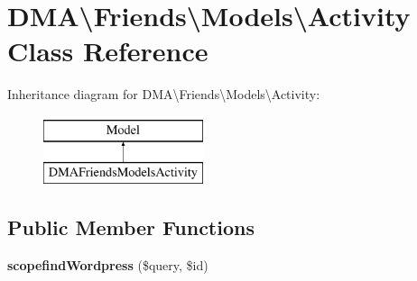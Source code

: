 \hypertarget{classDMA_1_1Friends_1_1Models_1_1Activity}{\section{D\-M\-A\textbackslash{}Friends\textbackslash{}Models\textbackslash{}Activity Class Reference}
\label{classDMA_1_1Friends_1_1Models_1_1Activity}
}
Inheritance diagram for D\-M\-A\textbackslash{}Friends\textbackslash{}Models\textbackslash{}Activity\-:\begin{figure}[H]
\begin{center}
\leavevmode
\includegraphics[height=2.000000cm]{dc/d8c/classDMA_1_1Friends_1_1Models_1_1Activity}
\end{center}
\end{figure}
\subsection*{Public Member Functions}
\begin{DoxyCompactItemize}
\item 
\hypertarget{classDMA_1_1Friends_1_1Models_1_1Activity_a5a533a3f638f99d1dd0a8e0550def49e}{{\bfseries scopefind\-Wordpress} (\$query, \$id)}\label{classDMA_1_1Friends_1_1Models_1_1Activity_a5a533a3f638f99d1dd0a8e0550def49e}

\end{DoxyCompactItemize}
